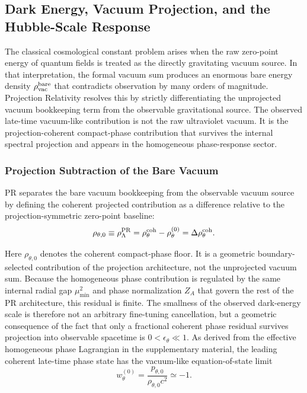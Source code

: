 \documentclass[11pt]{article}
\begin{document}
\subsection{Dark Energy, Vacuum Projection, and the Hubble-Scale Response}
\label{sec:dark_energy}

The classical cosmological constant problem arises when the raw zero-point energy of quantum fields is treated as the directly gravitating vacuum source. In that interpretation, the formal vacuum sum produces an enormous bare energy density \(\rho_{\rm vac}^{\rm bare}\) that contradicts observation by many orders of magnitude. Projection Relativity resolves this by strictly differentiating the unprojected vacuum bookkeeping term from the observable gravitational source. The observed late-time vacuum-like contribution is not the raw ultraviolet vacuum. It is the projection-coherent compact-phase contribution that survives the internal spectral projection and appears in the homogeneous phase-response sector.

\subsubsection{Projection Subtraction of the Bare Vacuum}

PR separates the bare vacuum bookkeeping from the observable vacuum source by defining the coherent projected contribution as a difference relative to the projection-symmetric zero-point baseline:
\begin{equation}
\rho_{\theta,0}
\equiv
\rho_{\Lambda}^{\rm PR}
=
\rho_{\theta}^{\rm coh}
-
\rho_{\theta}^{(0)}
=
\Delta\rho_{\theta}^{\rm coh}.
\end{equation}

Here \(\rho_{\theta,0}\) denotes the coherent compact-phase floor. It is a geometric boundary-selected contribution of the projection architecture, not the unprojected vacuum sum. Because the homogeneous phase contribution is regulated by the same internal radial gap \(\mu_{\min}^2\) and phase normalization \(Z_A\) that govern the rest of the PR architecture, this residual is finite. The smallness of the observed dark-energy scale is therefore not an arbitrary fine-tuning cancellation, but a geometric consequence of the fact that only a fractional coherent phase residual survives projection into observable spacetime is $0<\epsilon_\theta\ll1$. As derived from the effective homogeneous phase Lagrangian in the supplementary material, the leading coherent late-time phase state has the vacuum-like equation-of-state limit
\begin{equation}
w_\theta^{(0)}
=
\frac{p_{\theta,0}}{\rho_{\theta,0}c^2}
\simeq
-1.
\end{equation}
\end{document}
